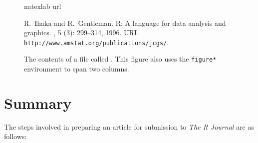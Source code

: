 \begin{figure*}[b]
\begin{center}
\begin{boxedverbatim}
\begin{thebibliography}{1}
\expandafter\ifx\csname natexlab\endcsname\relax\def\natexlab#1{#1}\fi
\expandafter\ifx\csname url\endcsname\relax
  \def\url#1{{\tt #1}}\fi

R.~Ihaka and R.~Gentleman.
\newblock R: A language for data analysis and graphics.
, 5
  (3): 299--314, 1996.
\newblock URL \url{http://www.amstat.org/publications/jcgs/}.

\end{thebibliography}
\end{boxedverbatim}
\end{center}
\caption{\label{figure:bblexample}
The contents of a file called .  This figure also
uses the {\tt figure*} environment to span
two columns.}
\end{figure*}

\section{Summary}

The steps involved in preparing an article for submission to \emph{The R Journal}
are as follows:

